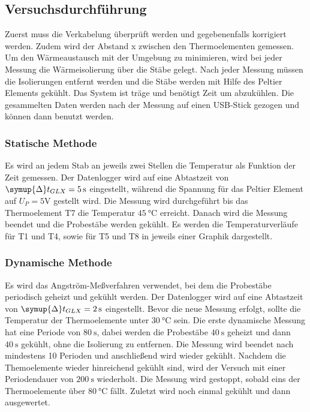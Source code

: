 \subsection{Versuchsdurchführung}
\label{sec:Vdurch}
Zuerst muss die Verkabelung überprüft werden und gegebenenfalls korrigiert werden. 
Zudem wird der Abstand x zwischen den Thermoelementen gemessen.
Um den Wärmeaustausch mit der Umgebung zu minimieren, wird bei jeder
Messung die Wärmeisolierung über die Stäbe gelegt. Nach jeder Messung müssen die Isolierungen entfernt werden und die Stäbe werden mit Hilfe des Peltier Elements gekühlt.
Das System ist träge und benötigt Zeit um abzukühlen. Die gesammelten Daten werden nach der Messung auf einen USB-Stick gezogen und können dann benutzt werden.\\
\subsubsection{Statische Methode}
Es wird an jedem Stab an jeweils zwei Stellen die Temperatur als Funktion der Zeit gemessen. 
Der Datenlogger wird auf eine Abtastzeit von $\symup{\Delta} t_{GLX}=\SI{5}{\second}$ eingestellt, während die Spannung für das Peltier Element auf $U_P=5\si{\volt}$ gestellt wird.
Die Messung wird durchgeführt bis das Thermoelement T7 die Temperatur $\SI{45}{\celsius}$ erreicht. Danach wird die Messung beendet und die Probestäbe werden gekühlt.
Es werden die Temperaturverläufe für T1 und T4, sowie für T5 und T8 in jeweils einer Graphik dargestellt.
\subsubsection{Dynamische Methode}
Es wird das Angström-Meßverfahren verwendet, bei dem die Probestäbe periodisch geheizt und gekühlt werden.
Der Datenlogger wird auf eine Abtastzeit von $\symup{\Delta}t_{GLX}=\SI{2}{\second}$ eingestellt.
Bevor die neue Messung erfolgt, sollte die Temperatur der Thermoelemente unter $\SI{30}{\celsius}$ sein.
Die erste dynamische Messung hat eine Periode von $\SI{80}{\second}$, dabei werden die Probestäbe $\SI{40}{\second}$ geheizt und dann $\SI{40}{\second}$ gekühlt, ohne die Isolierung zu entfernen.
Die Messung wird beendet nach mindestens 10 Perioden und anschließend wird wieder gekühlt.
Nachdem die Themoelemente wieder hinreichend gekühlt sind, wird der Versuch mit einer Periodendauer von $\SI{200}{\second}$ wiederholt.
Die Messung wird gestoppt, sobald eins der Thermoelemente über $\SI{80}{\celsius}$ fällt.
Zuletzt wird noch einmal gekühlt und dann ausgewertet.